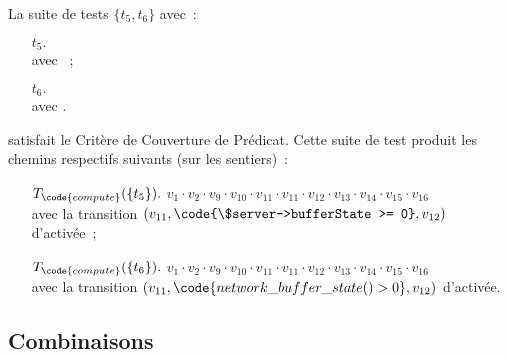 \begin{example}

La suite de tests $\{t_5, t_6\}$ avec~:
%
\begin{itemize}

\item[$t_5.$]  \\
avec ~;

\item[$t_6.$]  \\
avec .

\end{itemize}
%
satisfait le Critère de Couverture de Prédicat. Cette suite de test produit les
chemins respectifs suivants (sur les sentiers)~:
%
\begin{itemize}

\item[$T_\code{compute}(\{t_5\}).$]
%
$v_1 \cdot v_2 \cdot v_9 \cdot v_{10} \cdot v_{11} \cdot v_{11} \cdot v_{12}
\cdot v_{13} \cdot v_{14} \cdot v_{15} \cdot v_{16}$ \\
avec la transition $(v_{11}, \code{\$server->bufferState >= 0}, v_{12})$
d'activée~;

\item[$T_\code{compute}(\{t_6\}).$]
%
$v_1 \cdot v_2 \cdot v_9 \cdot v_{10} \cdot v_{11} \cdot v_{11} \cdot v_{12}
\cdot v_{13} \cdot v_{14} \cdot v_{15} \cdot v_{16}$ \\
avec la transition $(v_{11}, \code{network\_buffer\_state() > 0}, v_{12})$
d'activée.

\end{itemize}

\end{example}

\subsection{Combinaisons}

